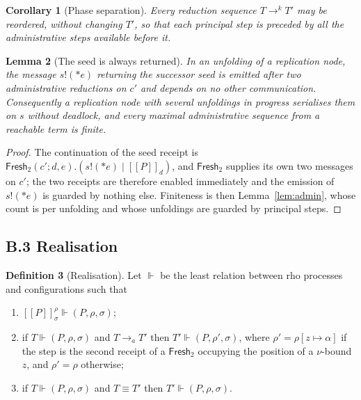 \documentclass[11pt]{article}
\theoremstyle{definition}
\newtheorem{definition}{Definition}[section]
\theoremstyle{plain}
\newtheorem{lemma}[definition]{Lemma}
\newtheorem{corollary}[definition]{Corollary}
\theoremstyle{remark}
\newcommand{\drp}[1]{{*}#1}
\newcommand{\out}[2]{#1!(#2)}
\newcommand{\enc}[1]{[\![#1]\!]}
\newcommand{\Frsh}{\mathsf{Fresh}_2}
\newcommand{\real}{\Vdash}
\begin{document}
\begin{corollary}[Phase separation]\label{cor:phases}
Every reduction sequence $T \to^{k} T'$ may be reordered, without
changing $T'$, so that each principal step is preceded by all the
administrative steps available before it.
\end{corollary}

\begin{lemma}[The seed is always returned]\label{lem:seed}
In an unfolding of a replication node, the message $\out{s}{\drp{e}}$
returning the successor seed is emitted after two administrative
reductions on $c'$ and depends on no other communication. Consequently a
replication node with several unfoldings in progress serialises them on
$s$ without deadlock, and every maximal administrative sequence from a
reachable term is finite.
\end{lemma}

\begin{proof}
The continuation of the seed receipt is
$\Frsh(c';d,e).(\out{s}{\drp{e}} \mid \enc{P}_d)$, and $\Frsh$ supplies its
own two messages on $c'$; the two receipts are therefore enabled
immediately and the emission of $\out{s}{\drp{e}}$ is guarded by nothing
else. Finiteness is then Lemma~\ref{lem:admin}, whose count is per
unfolding and whose unfoldings are guarded by principal steps.
\end{proof}

\subsection{B.3 Realisation}

\begin{definition}[Realisation]\label{def:real}
Let $\real$ be the least relation between rho processes and
configurations such that
\begin{enumerate}[label=(\roman*),leftmargin=2.2em,nosep]
\item $\enc{P}^\rho_\sigma \real (P,\rho,\sigma)$;
\item if $T \real (P,\rho,\sigma)$ and $T \to_a T'$ then
$T' \real (P,\rho',\sigma)$, where $\rho' = \rho[z \mapsto \alpha]$ if the
step is the second receipt of a $\Frsh$ occupying the position of a
$\nu$-bound $z$, and $\rho' = \rho$ otherwise;
\item if $T \real (P,\rho,\sigma)$ and $T \equiv T'$ then
$T' \real (P,\rho,\sigma)$.
\end{enumerate}
\end{definition}
\end{document}

